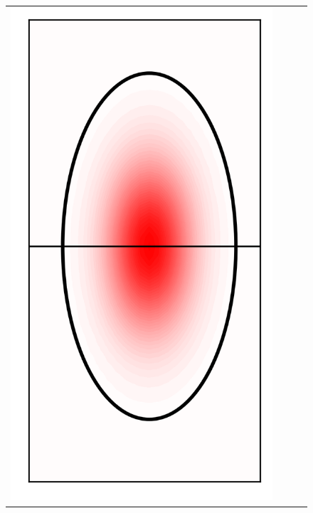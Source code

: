 \documentclass[10pt,final,xcolor=dvipsnames]{beamer}
\begin{document}
\begin{frame}
\begin{figure}
{\begin{tabular}{cccc}
	    \includegraphics[scale=0.2]{localpsf_revised_figures/ricker_ellipsoid_a=0.0.png} & 

\end{tabular}}
\end{figure}
\end{frame}
\end{document}
